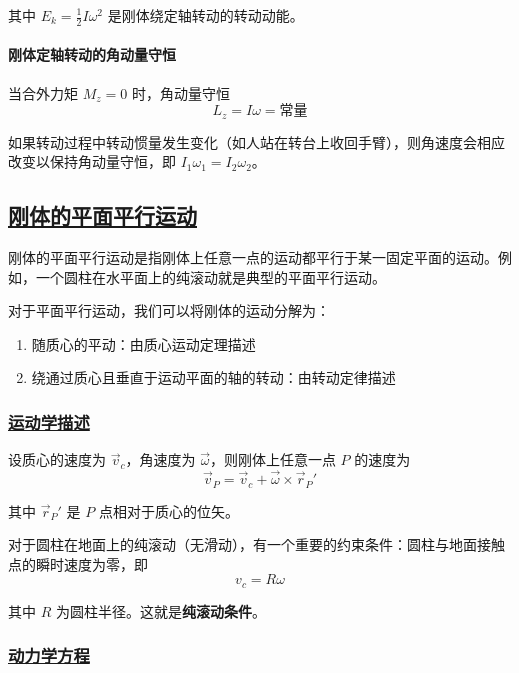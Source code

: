 其中 $E_k = \frac{1}{2}I\omega^2$ 是刚体绕定轴转动的转动动能。

\paragraph*{刚体定轴转动的角动量守恒} 当合外力矩 $M_z = 0$ 时，角动量守恒
\begin{equation}
    L_z = I\omega = \text{常量}
\end{equation}

如果转动过程中转动惯量发生变化（如人站在转台上收回手臂），则角速度会相应改变以保持角动量守恒，即 $I_1\omega_1 = I_2\omega_2$。


\subsection{\protect\hyperlink{:}{刚体的平面平行运动}}

刚体的平面平行运动是指刚体上任意一点的运动都平行于某一固定平面的运动。例如，一个圆柱在水平面上的纯滚动就是典型的平面平行运动。

对于平面平行运动，我们可以将刚体的运动分解为：
\begin{enumerate}
    \item 随质心的平动：由质心运动定理描述
    \item 绕通过质心且垂直于运动平面的轴的转动：由转动定律描述
\end{enumerate}

\subsubsection{\protect\hyperlink{:}{运动学描述}}

设质心的速度为 $\vec{v}_c$，角速度为 $\vec{\omega}$，则刚体上任意一点 $P$ 的速度为
\begin{equation}
    \vec{v}_P = \vec{v}_c + \vec{\omega} \times \vec{r}_P'
\end{equation}

其中 $\vec{r}_P'$ 是 $P$ 点相对于质心的位矢。

对于圆柱在地面上的纯滚动（无滑动），有一个重要的约束条件：圆柱与地面接触点的瞬时速度为零，即
\begin{equation}
    v_c = R\omega
\end{equation}

其中 $R$ 为圆柱半径。这就是\textbf{纯滚动条件}。

\subsubsection{\protect\hyperlink{:}{动力学方程}}


